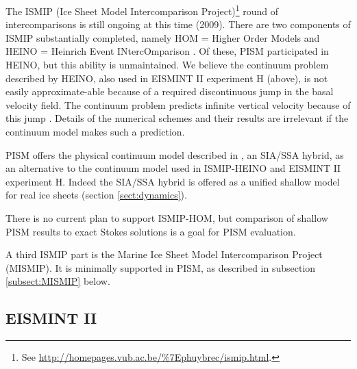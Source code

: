 The ISMIP (Ice Sheet Model Intercomparison Project)\footnote{See \url{http://homepages.vub.ac.be/\%7Ephuybrec/ismip.html}.} round of intercomparisons is still ongoing at this time (2009).  There are two components of ISMIP substantially completed, namely HOM = Higher Order Models \cite{ISMIPHOM,HOMelmer} and HEINO = Heinrich Event INtercOmparison \cite{GreveTakahamaCalov,Calovetal2009HEINOfinal}.  Of these, PISM participated in HEINO, but this ability is unmaintained.   We believe the continuum problem described by HEINO, also used in EISMINT II experiment H (above), is not easily approximate-able because of a required discontinuous jump in the basal velocity field.  The continuum problem predicts infinite vertical velocity because of this jump \cite[Appendix B]{BBssasliding}.  Details of the numerical schemes and their results are irrelevant if the continuum model makes such a prediction.

PISM offers the physical continuum model described in \cite{BBssasliding}, an SIA/SSA hybrid, as an alternative to the continuum model used in ISMIP-HEINO and EISMINT II experiment H.  Indeed the SIA/SSA hybrid is offered as a unified shallow model for real ice sheets (section \ref{sect:dynamics}).

There is no current plan to support ISMIP-HOM, but comparison of shallow PISM results to exact Stokes solutions is a goal for PISM evaluation.

A third ISMIP part is the Marine Ice Sheet Model Intercomparison Project (MISMIP).  It is minimally supported in PISM, as described in subsection \ref{subsect:MISMIP} below.


\subsection{EISMINT II}\label{subsect:EISMINTII}
\renewcommand{\optindexsection}{EISMINT II}

